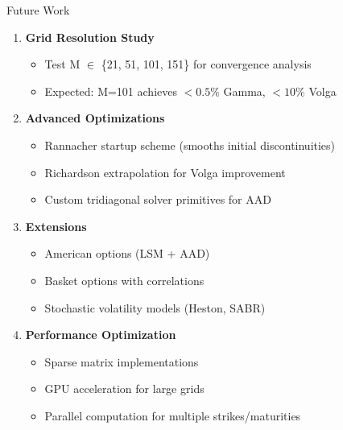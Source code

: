 \documentclass[aspectratio=169]{beamer}
\begin{document}
\begin{frame}{Future Work}
\begin{enumerate}
    \item \textbf{Grid Resolution Study}
    \begin{itemize}
        \item Test M $\in$ \{21, 51, 101, 151\} for convergence analysis
        \item Expected: M=101 achieves $<0.5\%$ Gamma, $<10\%$ Volga
    \end{itemize}

    \item \textbf{Advanced Optimizations}
    \begin{itemize}
        \item Rannacher startup scheme (smooths initial discontinuities)
        \item Richardson extrapolation for Volga improvement
        \item Custom tridiagonal solver primitives for AAD
    \end{itemize}

    \item \textbf{Extensions}
    \begin{itemize}
        \item American options (LSM + AAD)
        \item Basket options with correlations
        \item Stochastic volatility models (Heston, SABR)
    \end{itemize}

    \item \textbf{Performance Optimization}
    \begin{itemize}
        \item Sparse matrix implementations
        \item GPU acceleration for large grids
        \item Parallel computation for multiple strikes/maturities
    \end{itemize}
\end{enumerate}
\end{frame}
\end{document}
